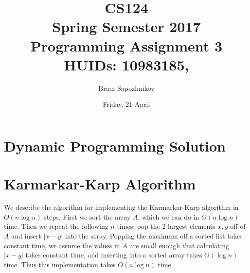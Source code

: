 \documentclass[10pt,letter]{article}
\begin{document}
\title{
  CS124                    \\
  Spring Semester 2017     \\
  Programming Assignment 3 \\
  HUIDs: 10983185, 
}
\author{Brian Sapozhnikov}
\date{Friday, 21 April}
 
\maketitle 

\section{Dynamic Programming Solution}

\section{Karmarkar-Karp Algorithm}

We describe the algorithm for implementing the Karmarkar-Karp algorithm in $O(n\log{n})$ steps. First we sort the array $A$, which we can do in $O(n\log{n})$ time. Then we repeat the following $n$ times: pop the 2 largest elements $x,y$ off of $A$ and insert $|x-y|$ into the array. Popping the maximum off a sorted list takes constant time, we assume the values in $A$ are small enough that calculating $|x-y|$ takes constant time, and inserting into a sorted array takes $O(\log{n})$ time. Thus this implementation takes $O(n\log{n})$ time.
\end{document}
